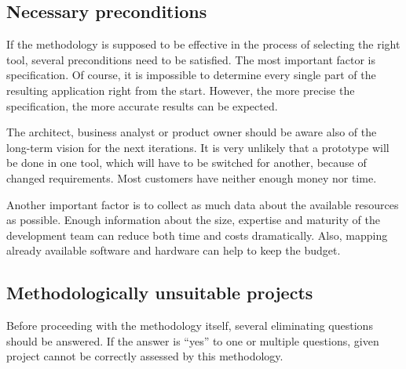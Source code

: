 \documentclass[english,master,public,dept460,male,cpdeclaration,oneside]{diploma}
\begin{document}
\subsection{Necessary preconditions}
If the methodology is supposed to be effective in the process of selecting the right tool, several preconditions need to be satisfied. The most important factor is specification. Of course, it is impossible to determine every single part of the resulting application right from the start. However, the more precise the specification, the more accurate results can be expected. 

The architect, business analyst or product owner should be aware also of the long-term vision for the next iterations. It is very unlikely that a prototype will be done in one tool, which will have to be switched for another, because of changed requirements. Most customers have neither enough money nor time.

Another important factor is to collect as much data about the available resources as possible. Enough information about the size, expertise and maturity of the development team can reduce both time and costs dramatically. Also, mapping already available software and hardware can help to keep the budget.

\subsection{Methodologically unsuitable projects}

Before proceeding with the methodology itself, several eliminating questions should be answered. If the answer is “yes” to one or multiple questions, given project cannot be correctly assessed by this methodology.
\end{document}
